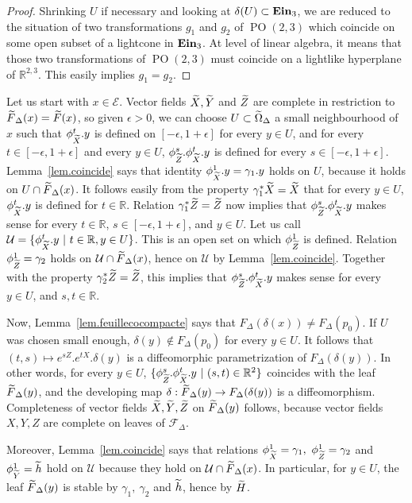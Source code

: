 \documentclass[11pt]{article}
\theoremstyle{definition}
\numberwithin{equation}{section}
\numberwithin{figure}{section}
\numberwithin{table}{section}
\DeclareMathOperator{\ein}{{\bf Ein}_3}
\newcommand{\tX}{\tilde{{X}}}
\newcommand{\tY}{\tilde{{Y}}}
\newcommand{\tZ}{\tilde{{Z}}}
\newcommand{\tFd}{\tilde{{F}}_{\Delta}}
\newcommand{\tF}{\tilde{{F}}}
\newcommand{\tth}{\tilde{h}}
\newcommand{\calfd}{{{\mathcal{F}}}_{\Delta}}
\newcommand*\RR{\mathbb{R}}
\DeclareMathOperator{\POop}{PO}
\newcommand{\PO}{{\POop(2,3)}}
\let\oldtilde\tilde
\renewcommand*\tilde[1]{\mathchoice{\widetilde{#1}}{\widetilde{#1}}{\widetilde{#1}}{\oldtilde{#1}}}
\begin{document}
\begin{proof}
Shrinking $U$ if necessary and looking at $\delta(U) \subset \ein$, we are reduced to the situation of two transformations $g_1$ and $g_2$ of $\PO$ which coincide on some open subset of a lightcone in $\ein$. At level of linear algebra, it means that those two transformations of $\PO$ must coincide on a lightlike hyperplane of $\RR^{2,3}$. This easily implies $g_1=g_2$.
\end{proof}


Let us start with $x \in \mathcal{E}$. Vector fields $\tX,\tY$ and $\tZ$ are complete in restriction to $\tFd(x)=\tF(x)$, so given $\epsilon >0$, we can choose $U \subset \tilde{\Omega}_{\Delta}$ a small neighbourhood of $x$ such that $\phi_{\tX}^t.y$ is defined on $[-\epsilon, 1+\epsilon]$ for every $y \in U$, and for every $t \in [- \epsilon, 1+\epsilon]$ and every $y \in U$, $\phi_{\tZ}^s.\phi_{\tX}^t.y$ is defined for every $s \in [-\epsilon, 1+ \epsilon]$. Lemma~\ref{lem.coincide} says that identity $\phi_{\tX}^1.y=\gamma_1.y$ holds on $U$, because it holds on $U \cap \tFd(x)$. It follows easily from the property $\gamma_1^*\tX=\tX$ that for every $y \in U$, $\phi_{\tX}^t.y$ is defined for $t \in \RR$. Relation $\gamma_1^*\tZ=\tZ$ now implies that $\phi_{\tZ}^s.\phi_{\tX}^t.y$ makes sense for every $t \in \RR$, $s \in [- \epsilon, 1+\epsilon]$, and $y \in U$. Let us call $\mathcal{U}=\{ \phi_{\tX}^t.y \ | \ t \in \RR, y \in U\}$. This is an open set on which $\phi_{\tZ}^1$ is defined. Relation $\phi_{\tZ}^1=\gamma_2$ holds on ${\mathcal U} \cap \tFd(x)$, hence on ${\mathcal U}$ by Lemma~\ref{lem.coincide}. Together with the property $\gamma_2^* \tZ=\tZ$, this implies that $\phi_{\tZ}^s.\phi_{\tX}^t.y$ makes sense for every $y \in U$, and $s,t \in \RR$.

Now, Lemma~\ref{lem.feuillecocompacte} says that $F_{\Delta}(\delta(x))\not = F_{\Delta}(p_0)$. If $U$ was chosen small enough, $\delta(y) \not \in F_{\Delta}(p_0)$ for every $y \in U$. It follows that $(t,s) \mapsto e^{sZ}.e^{tX}.\delta(y)$ is a diffeomorphic parametrization of $F_{\Delta}(\delta(y))$. In other words, for every $y \in U$, $\{ \phi_{\tZ}^s.\phi_{\tX}^t.y \ | \ (s,t) \in \RR^2 \}$ coincides with the leaf $\tFd(y)$, and the developing map $\delta: \tFd(y) \to F_{\Delta}(\delta(y))$ is a diffeomorphism. Completeness of vector fields $\tX,\tY,\tZ$ on $\tFd(y)$ follows, because vector fields $X,Y,Z$ are complete on leaves of $\calfd$.

Moreover, Lemma~\ref{lem.coincide} says that relations $\phi_{\tX}^1=\gamma_1, \ \phi_{\tZ}^1=\gamma_2$ and $\phi_{\tY}^1=\tth$ hold on ${\mathcal U}$ because they hold on $\mathcal{U} \cap \tFd(x)$. In particular, for $y \in U$, the leaf $\tFd(y)$ is stable by $\gamma_1, \ \gamma_2$ and $\tth$, hence by $\tilde{H}$.
\end{document}
